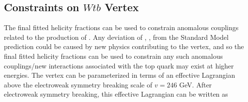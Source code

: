 



\subsection{Constraints on $Wtb$ Vertex}
The final fitted helicity fractions can be used to constrain anomalous couplings related to the production of \ttbar. Any deviation of \fo , \fl , \fr from the Standard Model prediction could be caused by new physics contributing to the \Wtb vertex, and so the final fitted helicity fractions can be used to constrain any such anomalous couplings/new interactions associated with the top quark may exist at higher energies. The \Wtb vertex can be parameterized in terms of an effective Lagrangian~\cite{JAASandCia_ProbingWtb} above the electroweak symmetry breaking scale of $v = 246$ GeV. After electroweak symmetry breaking, this effective Lagrangian can be written as

